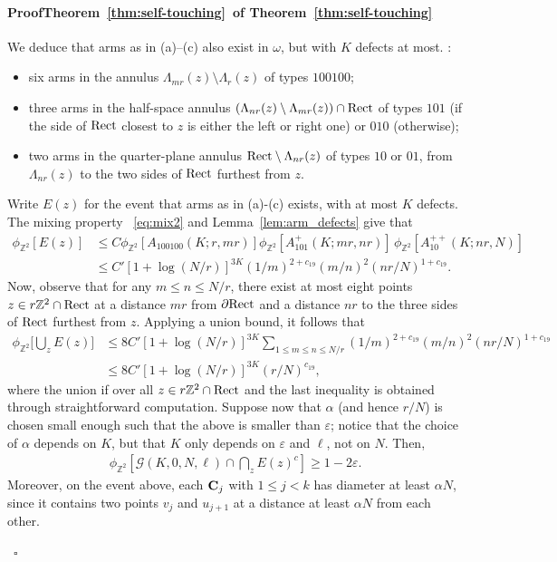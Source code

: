 \documentclass[a4paper,oneside,11pt]{article}
\numberwithin{equation}{section}
\numberwithin{equation}{section}
\numberwithin{equation}{section}
\newenvironment{proof}[1][\relax]%
  {\paragraph{Proof\ifx#1\relax\else~of #1\fi}}%
  {~\hfill$\square$\par\bigskip}
\newcommand{\calG}{\mathcal{G}}
\newcommand{\bbZ}{\mathbb{Z}}
\newcommand{\eps}{\varepsilon}
\newcommand{\La}{\Lambda}
\begin{document}
\begin{proof}[Theorem~\ref{thm:self-touching}]
{		We deduce that arms as in (a)--(c) also exist in $\omega$, but with $K$ defects at most.
	}:
	\begin{itemize}
    	\item[(a)] six arms in the annulus $\La_{mr}(z)\setminus \La_r(z)$ of types $100100$;
    	\item[(b)] three arms in the half-space annulus $(\La_{nr}(z)\setminus \La_{mr}(z)) \cap \Rect$ 
    	of types $101$ (if the side of ${\rm Rect}$ closest to $z$ is either the left or right one) or $010$ (otherwise);
    	\item[(c)] two arms in the quarter-plane annulus $\Rect \setminus \La_{nr}(z)$ of types $10$ or $01$, 
    	from $\La_{nr}(z)$ to the two sides of ${\rm Rect}$ furthest from $z$. 
	\end{itemize}
	Write $E(z)$ for the event that arms as in (a)-(c) exists, with at most $K$ defects.	The mixing property ~\eqref{eq:mix2} and Lemma~\ref{lem:arm_defects} give that 
	\begin{align*}
		\phi_{\bbZ^2}[E(z)] 
		&\leq C \phi_{\bbZ^2}[A_{100100}(K;r,mr)] \phi_{\bbZ^2}[A_{101}^{+}(K;mr,nr)]\, \phi_{\bbZ^2}[A_{10}^{++}(K;nr,N)]	\\
		&\leq C' [1+\log (N/r)]^{3K}(1/m)^{2 + c_{19}} (m/n)^{2}  (nr/N)^{1 + c_{19}} .
	\end{align*}
	Now, observe that for any $m\leq n\leq N/r$, 
	there exist at most eight points $z \in r \bbZ^2 \cap \Rect$ at a distance $mr$ from $\partial {\rm Rect}$ 
	and a distance $nr$ to the three sides of ${\rm Rect}$ furthest from $z$. 
	Applying a union bound, it follows that
	\begin{align*}
		\phi_{\bbZ^2}\big[\bigcup_{z}E(z)\big]
		& \leq 8C'  [1+\log (N/r)]^{3K} \sum_{1 \leq m \leq n \leq N/r} (1/m)^{2 +c_{19}} (m/n)^{2}  (nr/N)^{1 + c_{19}}\\
		&\leq 8C' [1+\log (N/r)]^{3K} (r/N)^{c_{19}},
	\end{align*}
	where the union if over all $z \in r \bbZ^2 \cap \Rect$ and the last inequality is obtained through straightforward computation. 
	Suppose now that $\alpha$ (and hence $r/N$) is chosen small enough such that the above is smaller than $\eps$; 
	notice that the choice of $\alpha$ depends on $K$, but that $K$ only depends on $\eps$ and $\ell$, not on $N$. 
	Then,
	\begin{align}\label{eq:HK}
		\phi_{\bbZ^2}[\calG(K,0,N,\ell) \cap \bigcap_{z}E(z)^c ] \geq 1- 2\eps.
	\end{align}
	Moreover, on the event above, each ${\bf C}_j$ with $1 \leq j < k$ has diameter at least $\alpha N$, 
	since it contains two points $v_j$ and $u_{j+1}$ at a distance at least $\alpha N$ from each other.
	

\end{proof}
\end{document}
